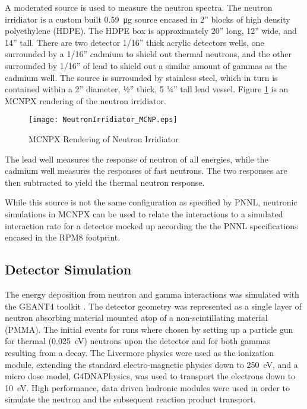 \documentclass[draftcls,onecolumn]{IEEEtran}
\begin{document}
A moderated  source is used to measure the neutron spectra.
The neutron irridiator is a custom built \SI{0.59}{\ug} source encased in 2” blocks of high density polyethylene (HDPE).
The HDPE box is approximately 20” long, 12” wide, and 14” tall.
There are two detector 1/16” thick acrylic detectors wells, one surrounded by a 1/16” cadmium to shield out thermal neutrons, and the other surrounded by 1/16” of lead to shield out a similar amount of gammas as the cadmium well.
The  source is surrounded by stainless steel, which in turn is contained within a 2” diameter, ½” thick, 5 ¼” tall lead vessel. 
Figure \ref{fig:neutronIrridiator} is an MCNPX rendering of the neutron irridiator.
\begin{figure}[ht]
	\centering
	\texttt{[image: NeutronIrridiator\_MCNP.eps]}
	\caption{MCNPX Rendering of Neutron Irridiator}
	\label{fig:neutronIrridiator}
\end{figure}
The lead well measures the response of neutron of all energies, while the cadmium well measures the responses of fast neutrons.
The two responses are then subtracted to yield the thermal neutron response.

While this source is not the same configuration as specified by PNNL, neutronic simulations in MCNPX can be used to relate the interactions to a simulated interaction rate for a detector mocked up according the the PNNL specifications encased in the RPM8 footprint.

\subsection{Detector Simulation}
The energy deposition from neutron and gamma interactions was simulated with the GEANT4 toolkit \cite{agostinelli_geant4simulation_2003}.
The detector geometry was represented as a single layer of neutron absorbing material mounted atop of a non-scintillating material (PMMA).
The initial events for runs where chosen by setting up a particle gun for thermal (\SI{0.025}{\eV}) neutrons upon the detector and for both gammas resulting from a  decay.
The Livermore physics were used as the ionization module, extending the standard electro-magnetic physics down to \SI{250}{\eV}, and a micro dose model, G4DNAPhysics, was used to transport the electrons down to \SI{10}{\eV}.
High performance, data driven hadronic modules were used in order to simulate the neutron and the subsequent reaction product transport.
\end{document}
